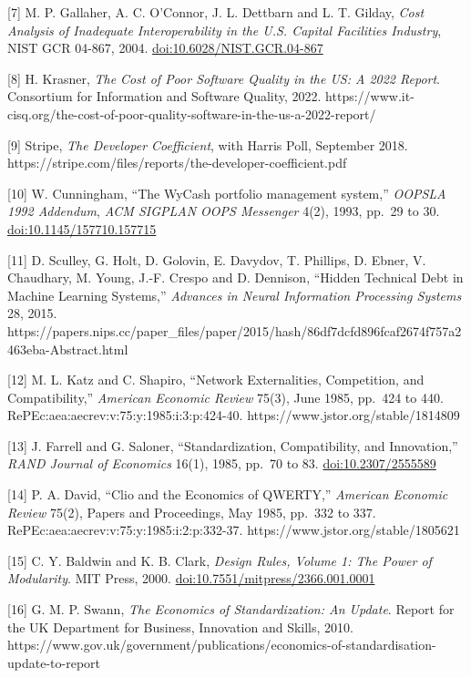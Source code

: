 \documentclass[
  10pt,
]{article}
\begin{document}
{[}7{]} M. P. Gallaher, A. C. O'Connor, J. L. Dettbarn and L. T. Gilday,
\emph{Cost Analysis of Inadequate Interoperability in the U.S. Capital
Facilities Industry}, NIST GCR 04-867, 2004.
\href{https://doi.org/10.6028/NIST.GCR.04-867}{doi:10.6028/NIST.GCR.04-867}

{[}8{]} H. Krasner, \emph{The Cost of Poor Software Quality in the US: A
2022 Report}. Consortium for Information and Software Quality, 2022.
https://www.it-cisq.org/the-cost-of-poor-quality-software-in-the-us-a-2022-report/

{[}9{]} Stripe, \emph{The Developer Coefficient}, with Harris Poll,
September 2018.
https://stripe.com/files/reports/the-developer-coefficient.pdf

{[}10{]} W. Cunningham, ``The WyCash portfolio management system,''
\emph{OOPSLA 1992 Addendum}, \emph{ACM SIGPLAN OOPS Messenger} 4(2),
1993, pp.~29 to 30.
\href{https://doi.org/10.1145/157710.157715}{doi:10.1145/157710.157715}

{[}11{]} D. Sculley, G. Holt, D. Golovin, E. Davydov, T. Phillips, D.
Ebner, V. Chaudhary, M. Young, J.-F. Crespo and D. Dennison, ``Hidden
Technical Debt in Machine Learning Systems,'' \emph{Advances in Neural
Information Processing Systems} 28, 2015.
https://papers.nips.cc/paper\_files/paper/2015/hash/86df7dcfd896fcaf2674f757a2463eba-Abstract.html

{[}12{]} M. L. Katz and C. Shapiro, ``Network Externalities,
Competition, and Compatibility,'' \emph{American Economic Review} 75(3),
June 1985, pp.~424 to 440. RePEc:aea:aecrev:v:75:y:1985:i:3:p:424-40.
https://www.jstor.org/stable/1814809

{[}13{]} J. Farrell and G. Saloner, ``Standardization, Compatibility,
and Innovation,'' \emph{RAND Journal of Economics} 16(1), 1985, pp.~70
to 83. \href{https://doi.org/10.2307/2555589}{doi:10.2307/2555589}

{[}14{]} P. A. David, ``Clio and the Economics of QWERTY,''
\emph{American Economic Review} 75(2), Papers and Proceedings, May 1985,
pp.~332 to 337. RePEc:aea:aecrev:v:75:y:1985:i:2:p:332-37.
https://www.jstor.org/stable/1805621

{[}15{]} C. Y. Baldwin and K. B. Clark, \emph{Design Rules, Volume 1:
The Power of Modularity}. MIT Press, 2000.
\href{https://doi.org/10.7551/mitpress/2366.001.0001}{doi:10.7551/mitpress/2366.001.0001}

{[}16{]} G. M. P. Swann, \emph{The Economics of Standardization: An
Update}. Report for the UK Department for Business, Innovation and
Skills, 2010.
https://www.gov.uk/government/publications/economics-of-standardisation-update-to-report
\end{document}
